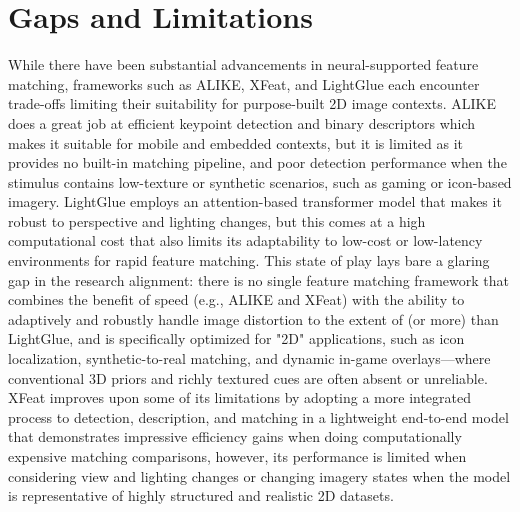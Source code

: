 \section{Gaps and Limitations}
While there have been substantial advancements in neural-supported feature matching, frameworks such as ALIKE, XFeat, and LightGlue each encounter trade-offs limiting their suitability for purpose-built 2D image contexts. ALIKE does a great job at efficient keypoint detection and binary descriptors which makes it suitable for mobile and embedded contexts, but it is limited as it provides no built-in matching pipeline, and poor detection performance when the stimulus contains low-texture or synthetic scenarios, such as gaming or icon-based imagery. LightGlue employs an attention-based transformer model that makes it robust to perspective and lighting changes, but this comes at a high computational cost that also limits its adaptability to low-cost or low-latency environments for rapid feature matching. This state of play lays bare a glaring gap in the research alignment: there is no single feature matching framework that combines the benefit of speed (e.g., ALIKE and XFeat) with the ability to adaptively and robustly handle image distortion to the extent of (or more) than LightGlue, and is specifically optimized for "2D" applications, such as icon localization, synthetic-to-real matching, and dynamic in-game overlays—where conventional 3D priors and richly textured cues are often absent or unreliable. XFeat improves upon some of its limitations by adopting a more integrated process to detection, description, and matching in a lightweight end-to-end model that demonstrates impressive efficiency gains when doing computationally expensive matching comparisons, however, its performance is limited when considering view and lighting changes or changing imagery states when the model is representative of highly structured and realistic 2D datasets.